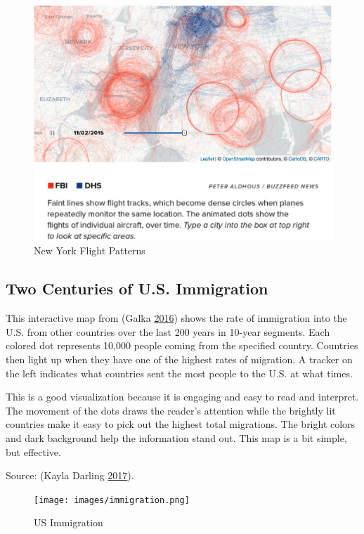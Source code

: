 \documentclass[]{book}
\begin{document}
\begin{figure}
\centering
\includegraphics{images/NYCflights.png}
\caption{New York Flight Patterns}
\end{figure}

\hypertarget{two-centuries-of-u.s.-immigration}{%
\subsection{Two Centuries of U.S. Immigration}\label{two-centuries-of-u.s.-immigration}}

This interactive map from (Galka \protect\hyperlink{ref-immigration}{2016}) shows the rate of immigration into the U.S. from other countries over the last 200 years in 10-year segments. Each colored dot represents 10,000 people coming from the specified country. Countries then light up when they have one of the highest rates of migration. A tracker on the left indicates what countries sent the most people to the U.S. at what times.

This is a good visualization because it is engaging and easy to read and interpret. The movement of the dots draws the reader's attention while the brightly lit countries make it easy to pick out the highest total migrations. The bright colors and dark background help the information stand out. This map is a bit simple, but effective.

Source: (Kayla Darling \protect\hyperlink{ref-cool_data}{2017}).

\begin{figure}
\centering
\texttt{[image: images/immigration.png]}
\caption{US Immigration}
\end{figure}
\end{document}
